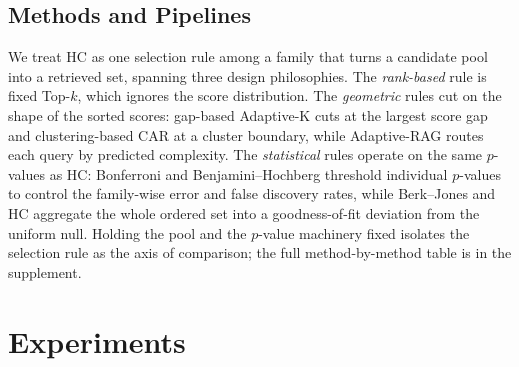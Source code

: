 \documentclass[letterpaper]{article} %
\begin{document}
\subsection{Methods and Pipelines}
We treat HC as one selection rule among a family that turns a candidate
pool into a retrieved set, spanning three design philosophies. The
\emph{rank-based} rule is fixed Top-$k$, which ignores the score
distribution. The \emph{geometric} rules cut on the shape of the sorted
scores: gap-based Adaptive-K \citep{adaptivek2025} cuts at the largest
score gap and clustering-based CAR \citep{xu2025car} at a cluster
boundary, while Adaptive-RAG \citep{jeong2024adaptiverag} routes each
query by predicted complexity. The \emph{statistical} rules operate on
the same $p$-values as HC: Bonferroni \citep{bonferroni1961dunn} and
Benjamini--Hochberg \citep{benjamini1995fdr} threshold individual
$p$-values to control the family-wise error and false discovery rates,
while Berk--Jones \citep{berkjones1979} and HC \citep{donohojin2004hc}
aggregate the whole ordered set into a goodness-of-fit deviation from the
uniform null. Holding the pool and the $p$-value machinery fixed isolates
the selection rule as the axis of comparison; the full method-by-method
table is in the supplement.

\section{Experiments}
\end{document}

